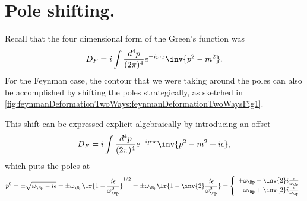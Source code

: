 %
%
\section{Pole shifting.}

Recall that the four dimensional form of the Green's function was
\begin{dmath}\label{eqn:qftLecture13:400}
D_F = i \int \frac{d^4 p}{(2 \pi)^4} e^{-i p \cdot x} \inv{ p^2 - m^2 }.
\end{dmath}
For the Feynman case, the contour that we were taking around the poles can also be accomplished by shifting the poles strategically, as sketched in \cref{fig:feynmanDeformationTwoWays:feynmanDeformationTwoWaysFig1}.


This shift can be expressed explicit algebraically by introducing an offset
\begin{dmath}\label{eqn:qftLecture13:420}
D_F = i \int \frac{d^4 p}{(2 \pi)^4} e^{-i p \cdot x} \inv{ p^2 - m^2 + i \epsilon },
\end{dmath}
which puts the poles at
\begin{dmath}\label{eqn:qftLecture13:440}
p^0
= \pm \sqrt{ \omega_\Bp - i \epsilon }
= \pm \omega_\Bp \lr{ 1 - \frac{i \epsilon}{\omega_\Bp^2} }^{1/2}
= \pm \omega_\Bp \lr{ 1 - \inv{2} \frac{i \epsilon}{\omega_\Bp^2} }
=
\left\{
\begin{array}{l}
+\omega_\Bp - \inv{2} i \frac{\epsilon}{\omega_\Bp} \\
-\omega_\Bp + \inv{2} i \frac{\epsilon}{\omega_\Bp} \\
\end{array}
\right.
\end{dmath}

